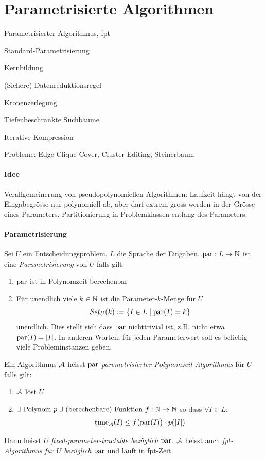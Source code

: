 \section{Parametrisierte Algorithmen}

\begin{takeaway}
    \item Parametrisierter Algorithmus, fpt
    \item Standard-Parametrisierung
    \item Kernbildung
    \item (Sichere) Datenreduktionsregel
    \item Kronenzerlegung
    \item Tiefenbeschränkte Suchbäume
    \item Iterative Kompression
    \item Probleme: Edge Clique Cover, Cluster Editing, Steinerbaum
\end{takeaway}

\paragraph{Idee}
Verallgemeinerung von pseudopolynomiellen Algorithmen:
Laufzeit hängt von der Eingabegrösse nur polynomiell ab, aber darf extrem gross werden in der Grösse eines Parameters.
Partitionierung in Problemklassen entlang des Parameters.

\paragraph{Parametrisierung}
Sei $U$ ein Entscheidungsproblem, $L$ die Sprache der Eingaben.
$\text{par}: L \mapsto \mathbb{N}$ ist eine \emph{Parametrisierung} von $U$ falls gilt:
\begin{enumerate}[label=(\roman*)]
    \item $\text{par}$ ist in Polynomzeit berechenbar
    \item Für unendlich viele $k \in \mathbb{N}$ ist die Parameter-$k$-Menge für $U$
    $$ Set_U(k) := \{ I \in L \; | \; \text{par}(I) = k \} $$ unendlich.
    Dies stellt sich dass $\text{par}$ nichttrivial ist, z.B. nicht etwa $\text{par}(I) = |I|$.
    In anderen Worten, für jeden Parameterwert soll es beliebig viele Probleminstanzen geben.
\end{enumerate}
Ein Algorithmus $\mathcal{A}$ heisst \emph{$\text{par}$-paremetrisierter Polynomzeit-Algorithmus} für $U$ falls gilt:
\begin{enumerate}[label=(\roman*)]
    \item $\mathcal{A}$ löst $U$
    \item $ \exists \text{ Polynom } p \; \exists \text{ (berechenbare) Funktion } f : \mathbb{N} \mapsto \mathbb{N}$
    so dass $\forall I \in L$:
    $$\text{time}_{\mathcal{A}}(I) \leq f \big( \text{par}(I) \big) \cdot p(|I|) $$
\end{enumerate}
Dann heisst $U$ \emph{fixed-parameter-tractable bezüglich $\text{par}$}.
$\mathcal{A}$ heisst auch \emph{fpt-Algorithmus für $U$ bezüglich $\text{par}$} und läuft in fpt-Zeit.

